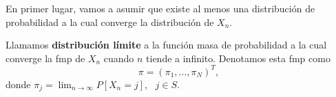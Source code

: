 En primer lugar, vamos a asumir que existe al menos una distribución de probabilidad a la cual converge la distribución de $X_n$.
\begin{definicion}
    Llamamos \textbf{distribución límite} a la función masa de probabilidad a la cual converge la fmp de $X_n$ cuando $n$ tiende a infinito. Denotamos esta fmp como
    \begin{equation}
        \label{eq:distr-limite}
        \pi = (\pi_1,\dots,\pi_N)^T,
    \end{equation}
    donde $\pi_j=\displaystyle\lim_{n\rightarrow\infty} P[X_n=j], \ \ \ j\in S$.
\end{definicion}

